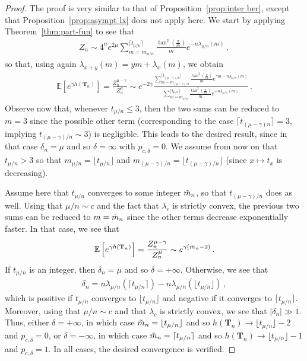 \documentclass{article}
\newcommand{\E}{\mathbb{E}}								%
\newcommand{\1}{\mathbbm{1}}								%
\theoremstyle{definition}
\numberwithin{equation}{section}
\newcommand{\bT}{\mathbf T}
\begin{document}
\begin{proof}
    The proof is very similar to that of Proposition~\ref{prop:inter ber}, except that Proposition~\ref{prop:asympt lx} does not apply here.
    We start by applying Theorem~\ref{thm:part-fun} to see that
    \begin{align*}
        Z_n\sim4^ne^{2\mu}\sum_{m=m_{\mu/n}}^{\lceil t_{\mu/n}\rceil}\frac{\tan^2\left(\frac{\pi}{m}\right)}{m}e^{-n\lambda_{\mu/n}(m)}\,,
    \end{align*}
    so that, using again $\lambda_{x+y}(m)=ym+\lambda_x(m)$, we obtain
    \begin{align*}
        \E\left[e^{\gamma h(\bT_n)}\right]=\frac{Z_n^{\mu-\gamma}}{Z_n^\mu}\sim e^{-2\gamma}\frac{\sum_{m=m_{(\mu-\gamma)/n}}^{\lceil t_{(\mu-\gamma)/n}\rceil}\frac{\tan^2\left(\frac{\pi}{m}\right)}{m}e^{\gamma m-n\lambda_{\mu/n}(m)}}{\sum_{m=m_{\mu/n}}^{\lceil t_{\mu/n}\rceil}\frac{\tan^2\left(\frac{\pi}{m}\right)}{m}e^{-n\lambda_{\mu/n}(m)}}\,.
    \end{align*}
    Observe now that, whenever $t_{\mu/n}\leq 3$, then the two sums can be reduced to $m=3$ since the possible other term (corresponding to the case $\lceil t_{(\mu-\gamma)n}\rceil=3$, {implying} $t_{(\mu-\gamma)/n}\sim3$) is negligible.
    This leads to the desired result, since in that case $\delta_n=\mu$ and so $\delta=\infty$ with $p_{c,\delta}=0$.
    We assume from now on that $t_{\mu/n}>3$ so that $m_{\mu/n}=\lfloor t_{\mu/n}\rfloor$ and $m_{(\mu-\gamma)/n}=\lfloor t_{(\mu-\gamma)/n}\rfloor$ (since $x\mapsto t_x$ is decreasing).
    
    Assume here that $t_{\mu/n}$ converges to some integer $\Tilde{m}_n$, so that $t_{(\mu-\gamma)/n}$ does as well.
    Using that $\mu/n\sim c$ and the fact that $\lambda_c$ is strictly convex, the previous two sums can be reduced to $m=\Tilde{m}_n$  since the other terms decrease exponentially faster.
    In that case, we see that
    \begin{align*}
        \E\left[e^{\gamma h(\bT_n)}\right]=\frac{Z_n^{\mu-\gamma}}{Z_n^\mu}\sim e^{\gamma(\Tilde{m}_n-2)}\,.
    \end{align*}
    If $t_{\mu/n}$ is an integer, then $\delta_n=\mu$ and so $\delta=+\infty$.
    Otherwise, we see that
    \begin{align*}
        \delta_n=n\lambda_{\mu/n}(\lceil t_{\mu/n}\rceil)-n\lambda_{\mu/n}(\lfloor t_{\mu/n}\rfloor)\,,
    \end{align*}
    which is positive if $t_{\mu/n}$ converges to $\lfloor t_{\mu/n}\rfloor$ and negative if it converges to $\lceil t_{\mu/n}\rceil$.
    Moreover, using that $\mu/n\sim c$ and that $\lambda_c$ is strictly convex, we see that $|\delta_n|\gg1$.
    Thus, either $\delta=+\infty$, in which case $\Tilde{m}_n=\lfloor t_{\mu/n}\rfloor$ and so $h(\bT_n)\rightarrow\lfloor t_{\mu/n}\rfloor-2$ and $p_{c,\delta}=0$, or $\delta=-\infty$, in which case $\Tilde{m}_n=\lceil t_{\mu/n}\rceil$ and so $h(\bT_n)\rightarrow\lfloor t_{\mu/n}\rfloor-1$ and $p_{c,\delta}=1$.
    In all cases, the desired convergence is verified.


\end{proof}
\end{document}
